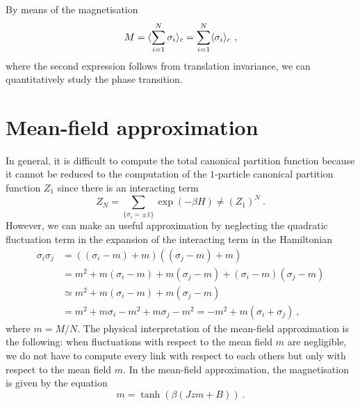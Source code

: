     By means of the magnetisation
    \begin{equation}\label{ph:m}
        M = \langle\sum_{i=1}^N \sigma_i\rangle_c = \sum_{i=1}^N \langle\sigma_i\rangle_c ~,
    \end{equation}
    where the second expression follows from translation invariance, we can quantitatively study the phase transition.

\section{Mean-field approximation} 

    In general, it is difficult to compute the total canonical partition function because it cannot be reduced to the computation of the $1$-particle canonical partition function $Z_1$ since there is an interacting term
    \begin{equation*}
        Z_N = \sum_{\{\sigma_i = \pm 1\}} \exp(- \beta H) \neq (Z_1)^N ~.
    \end{equation*}
    However, we can make an useful approximation by neglecting the quadratic fluctuation term in the expansion of the interacting term in the Hamiltonian
    \begin{equation*}
    \begin{aligned}
        \sigma_i \sigma_j & = ((\sigma_i - m) + m)((\sigma_j - m) + m) \\ & = m^2 + m(\sigma_i - m) + m (\sigma_j - m) + (\sigma_i - m)(\sigma_j - m) \\ & \simeq m^2 + m(\sigma_i - m) + m (\sigma_j - m) \\ & = m^2 + m\sigma_i - m^2 + m \sigma_j - m^2 = - m^2 + m (\sigma_i + \sigma_j) ~,
    \end{aligned}
    \end{equation*}
    where $m = M / N$.
    The physical interpretation of the mean-field approximation is the following: when fluctuations with respect to the mean field $m$ are negligible, we do not have to compute every link with respect to each others but only with respect to the mean field $m$. In the mean-field approximation, the magnetisation is given by the equation 
    \begin{equation*}
        m = \tanh(\beta(Jzm + B)) ~.
    \end{equation*}
